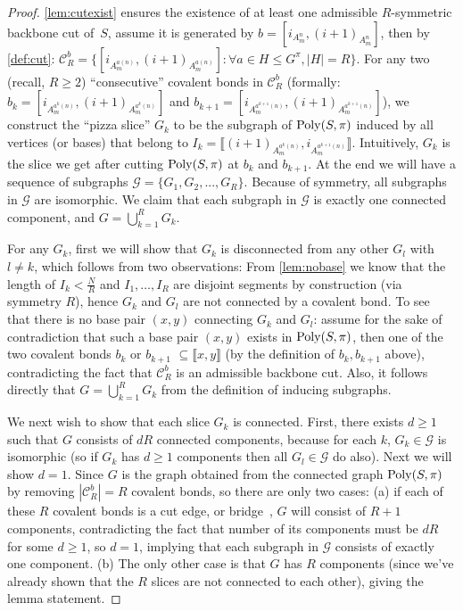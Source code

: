 \begin{proof}  
	\cref{lem:cutexist} ensures the existence of at least one admissible $R$-symmetric backbone cut of~$S$, assume it is generated by $b=[i_{A_m^n}, (i+1)_{A_m^n}]$, then by \cref{def:cut}:  $\mathcal{C}_R^b = \{ [i_{A_m^{a(n)}}, ({i+1})_{A_{m}^{a(n)}}]: \forall a \in H \!\!\leq \! G^\pi, |H| = R \}$. For any two (recall, $R\geq 2$) ``consecutive'' covalent bonds  in $\mathcal{C}_R^b$ (formally:   $b_k=[i_{A_m^{a^k(n)}}, ({i+1})_{A_{m}^{a^k(n)}}]$ and  $b_{k+1}=[i_{A_m^{a^{k+1}(n)}}, ({i+1})_{A_{m}^{a^{k+1}(n)}}]$),
	we construct the ``pizza slice'' $G_k$ to be the subgraph of $\mathrm{Poly}(S,\pi)$ induced by all vertices (or bases) that belong to $I_k = \llbracket ({i+1})_{A_{m}^{a^k(n)}},{i}_{A_{m}^{a^{k+1}(n)}} \rrbracket$. Intuitively, $G_k$ is the slice we get after cutting $\mathrm{Poly}(S,\pi)$ at $b_k$ and $b_{k+1}$. At the end we will have a sequence of subgraphs $\mathcal{G} = \{G_1,G_2, ... , G_R\}$. Because of symmetry, all subgraphs in $\mathcal{G}$ are isomorphic. We claim that each subgraph in $\mathcal{G}$ is exactly one connected component, and $G = \bigcup_{k=1}^R G_k$. 
	
	For any $G_k$, first we will show that $G_k$ is disconnected from any other $G_{l}$ with $l \neq k$, which follows from two observations:  
	From \cref{lem:nobase} we know that the length of $I_k < \frac{N}{R}$ and $I_1, \ldots , I_R$ are disjoint segments by construction (via symmetry $R$), hence $G_k$ and  $G_l$ are not connected by a covalent bond. 
	To see that  there is no base pair $(x,y)$ connecting $G_k$ and $G_l$:  
	assume for the sake of contradiction that such a base pair $(x,y)$ exists in $\mathrm{Poly}(S,\pi)$, then one of the two covalent bonds $b_k$ or $b_{k+1}$   $\subseteq \llbracket x,y \rrbracket$ (by the definition of $b_k, b_{k+1}$ above), contradicting the fact that $\mathcal{C}_R^b$ is an admissible backbone cut. Also, it follows directly that $G = \bigcup_{k=1}^R G_k$ from the definition of inducing subgraphs. 
	
	We next wish to show that each slice $G_k$ is connected. 
	First, there exists $d \geq 1$ such that  $G$ consists of $dR$ connected components, 
	because for each $k$, $G_k \in \mathcal{G}$ is isomorphic  
	(so if $G_k$ has $d\geq 1$ components then all $G_l \in \mathcal{G}$ do also). Next we  will show $d=1$. 
	Since $G$ is the graph obtained from the connected graph $\mathrm{Poly}(S,\pi)$ by removing $|\mathcal{C}_R^b| = R$ covalent bonds, so there are only two cases: 
	(a) 
	if each of these $R$ covalent bonds is a cut edge, or bridge~\cite{west2001introduction}, 
	$G$ will consist of $R+1$ components, 
	contradicting the fact that number of its components must be $dR$ for some $d\geq 1$, so $d = 1$, implying that each subgraph in $\mathcal{G}$ consists of exactly one component. 
	(b) The only other case is that $G$ has $R$ components (since we've already shown that the $R$ slices are not connected to each other), giving the lemma statement. 
\end{proof}


